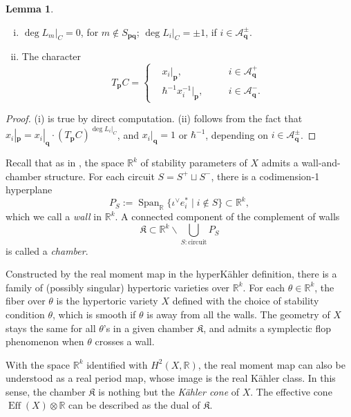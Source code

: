 \documentclass[10pt]{amsart}
\theoremstyle{definition}
\def\RR{{\mathbb{R}}}
\newcommand{\bp}{\mathbf{p}}
\newcommand{\bq}{\mathbf{q}}
\newcommand{\cA}{\mathcal{A}}
\newcommand{\Eff}{\operatorname{Eff}}
\newcommand{\Span}{\operatorname{Span}}
\theoremstyle{definition}
\numberwithin{equation}{section}
\theoremstyle{Theorem}
\newtheorem{Lemma}[Definition]{Lemma}
\begin{document}
\begin{Lemma} \label{bridge}
	\begin{enumerate}[(i)]
		
		\item $\deg L_m \big|_C = 0$, for $m \not\in S_{\bp \bq}$; $\deg L_i \big|_C = \pm 1$, if $i\in \cA_\bq^\pm$.
		
		\item The character
		$$
		T_\bp C = \left\{ \begin{aligned}
		&  x_i |_\bp  , && \quad i\in \cA_\bq^+ \\
		&  \hbar^{-1} x_i^{-1} |_\bp , && \quad i\in \cA_\bq^- .
		\end{aligned} \right.
		$$
		
	\end{enumerate}
\end{Lemma}

\begin{proof}
	
(i) is true by direct computation. (ii) follows from the fact that $x_i |_\bp = x_i |_\bq \cdot (T_\bp C)^{\deg L_i |_C}$, and $x_i |_\bq = 1$ or $\hbar^{-1}$, depending on $i\in \cA_\bq^\pm$.
\end{proof}

Recall that as in \cite{Kon}, the space $\RR^k$ of stability parameters of $X$ admits a wall-and-chamber structure. For each circuit $S = S^+ \sqcup S^-$, there is a codimension-1 hyperplane
$$
P_S := \Span_\RR \{ \iota^\vee e_i^* \mid i\not\in S \}\subset \RR^k,
$$
which we call a \emph{wall} in $\RR^k$. A connected component of the complement of walls
$$
\mathfrak{K} \subset \RR^k \backslash \bigcup_{S: \text{circuit}} P_S
$$
is called a \emph{chamber}.

Constructed by the real moment map in the hyperK\"ahler definition, there is a family of (possibly singular) hypertoric varieties over $\RR^k$. For each $\theta \in \RR^k$, the fiber over $\theta$ is the hypertoric variety $X$ defined with the choice of stability condition $\theta$, which is smooth if $\theta$ is away from all the walls. The geometry of $X$ stays the same for all $\theta$'s in a given chamber $\mathfrak{K}$, and admits a symplectic flop phenomenon when $\theta$ crosses a wall.

With the space $\RR^k$ identified with $H^2 (X, \RR)$, the real moment map can also be understood as a real period map, whose image is the real K\"ahler class. In this sense, the chamber $\mathfrak{K}$ is nothing but the \emph{K\"ahler cone} of $X$. The effective cone $\Eff (X) \otimes \RR$ can be described as the dual of $\mathfrak{K}$.
\end{document}
